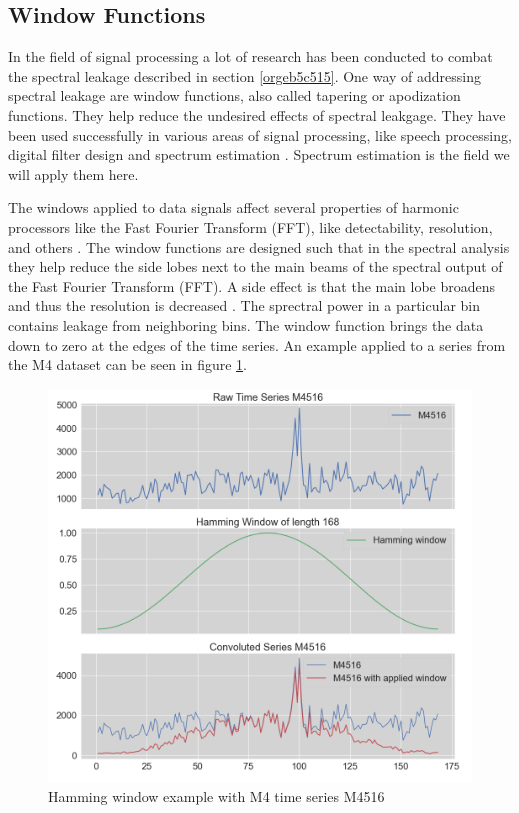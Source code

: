 \documentclass[phd,black, hidelinks]{PrincetonThesis}
\begin{document}
\subsection{Window Functions}
\label{sec:org58bf7ae}
In the field of signal processing a lot of research has been conducted to combat the spectral leakage described in section \ref{orgeb5c515}. One way of addressing spectral leakage are window functions, also called tapering or apodization functions. They help reduce the undesired effects of spectral leakgage. They have been used successfully in various areas of signal processing, like speech processing, digital filter design and spectrum estimation \cite{kumar2011}. Spectrum estimation is the field we will apply them here.

The windows applied to data signals affect several properties of harmonic processors like the Fast Fourier Transform (FFT), like detectability, resolution, and others \cite{harris1978}. The window functions are designed such that in the spectral analysis they help reduce the side lobes next to the main beams of the spectral output of the Fast Fourier Transform (FFT). A side effect is that the main lobe broadens and thus the resolution is decreased \cite{kumar2011}. The sprectral power in a particular bin contains leakage from neighboring bins. The window function brings the data  down to zero at the edges of the time series. An example applied to a series from the M4 dataset can be seen in figure \ref{fig:org9fc523e}.

\begin{figure}[htbp]
\centering
\includegraphics[width=.9\linewidth]{./img/ham_window_example.png}
\caption{\label{fig:org9fc523e}Hamming window example with M4 time series M4516}
\end{figure}
\end{document}
